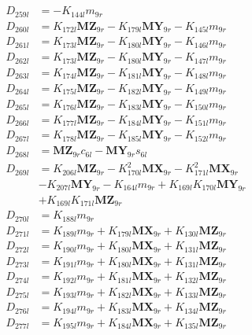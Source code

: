\begin{align}
 \nonumber \\ 
D_{259l} &= -K_{144l}m_{9r} \nonumber \\
D_{260l} &= K_{172l}\mathbf{MZ}_{9r} - K_{179l}\mathbf{MY}_{9r} - K_{145l}m_{9r} \nonumber \\
D_{261l} &= K_{173l}\mathbf{MZ}_{9r} - K_{180l}\mathbf{MY}_{9r} - K_{146l}m_{9r} \nonumber \\
D_{262l} &= K_{173l}\mathbf{MZ}_{9r} - K_{180l}\mathbf{MY}_{9r} - K_{147l}m_{9r} \nonumber \\
D_{263l} &= K_{174l}\mathbf{MZ}_{9r} - K_{181l}\mathbf{MY}_{9r} - K_{148l}m_{9r} \nonumber \\
D_{264l} &= K_{175l}\mathbf{MZ}_{9r} - K_{182l}\mathbf{MY}_{9r} - K_{149l}m_{9r} \nonumber \\
D_{265l} &= K_{176l}\mathbf{MZ}_{9r} - K_{183l}\mathbf{MY}_{9r} - K_{150l}m_{9r} \nonumber \\
D_{266l} &= K_{177l}\mathbf{MZ}_{9r} - K_{184l}\mathbf{MY}_{9r} - K_{151l}m_{9r} \nonumber \\
D_{267l} &= K_{178l}\mathbf{MZ}_{9r} - K_{185l}\mathbf{MY}_{9r} - K_{152l}m_{9r} \nonumber \\
D_{268l} &= \mathbf{MZ}_{9r}c_{6l} - \mathbf{MY}_{9r}s_{6l} \nonumber \\
D_{269l} &= K_{206l}\mathbf{MZ}_{9r} - K_{170l}^2\mathbf{MX}_{9r} - K_{171l}^2\mathbf{MX}_{9r}  \nonumber \\
&- K_{207l}\mathbf{MY}_{9r} - K_{164l}m_{9r} + K_{169l}K_{170l}\mathbf{MY}_{9r}  \nonumber \\
&+ K_{169l}K_{171l}\mathbf{MZ}_{9r} \nonumber \\
D_{270l} &= K_{188l}m_{9r} \nonumber \\
D_{271l} &= K_{189l}m_{9r} + K_{179l}\mathbf{MX}_{9r} + K_{130l}\mathbf{MZ}_{9r} \nonumber \\
D_{272l} &= K_{190l}m_{9r} + K_{180l}\mathbf{MX}_{9r} + K_{131l}\mathbf{MZ}_{9r} \nonumber \\
D_{273l} &= K_{191l}m_{9r} + K_{180l}\mathbf{MX}_{9r} + K_{131l}\mathbf{MZ}_{9r} \nonumber \\
D_{274l} &= K_{192l}m_{9r} + K_{181l}\mathbf{MX}_{9r} + K_{132l}\mathbf{MZ}_{9r} \nonumber \\
D_{275l} &= K_{193l}m_{9r} + K_{182l}\mathbf{MX}_{9r} + K_{133l}\mathbf{MZ}_{9r} \nonumber \\
D_{276l} &= K_{194l}m_{9r} + K_{183l}\mathbf{MX}_{9r} + K_{134l}\mathbf{MZ}_{9r} \nonumber \\
D_{277l} &= K_{195l}m_{9r} + K_{184l}\mathbf{MX}_{9r} + K_{135l}\mathbf{MZ}_{9r} \nonumber \\

\end{align}

